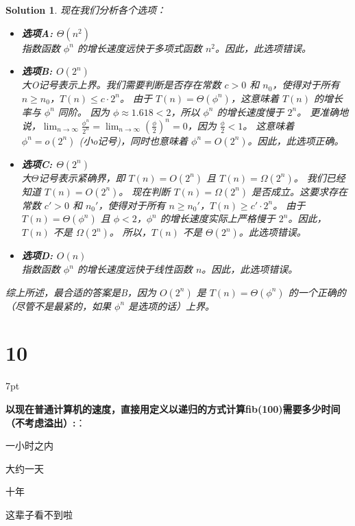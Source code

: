 \documentclass[UTF8]{report}
\newtheorem{solution}{Solution}
\theoremstyle{MyLineTheoremStyle} %
\theoremstyle{MyBlockTheoremStyle} %
\theoremstyle{MySubsubsectionStyle} %
\newenvironment{graybox}{%
        \def\FrameCommand{%
        \hspace{1pt}%
        {\color{gray}\small \vrule width 2pt}%
        {\color{graybox_color}\vrule width 4pt}%
        \colorbox{graybox_color}%
        }%
        \MakeFramed{\advance\hsize-\width\FrameRestore}%
        \noindent\hspace{-4.55pt}%
        \begin{adjustwidth}{}{7pt}%
        \vspace{2pt}\vspace{2pt}%
        }
        {%
        \vspace{2pt}\end{adjustwidth}\endMakeFramed%
        }
\begin{document}
\begin{solution}
现在我们分析各个选项：
\begin{itemize}
    \item \textbf{选项A: $\Theta(n^2)$} \\
    指数函数 $\phi^n$ 的增长速度远快于多项式函数 $n^2$。因此，此选项错误。
    \item \textbf{选项B: $O(2^n)$} \\
    大O记号表示上界。我们需要判断是否存在常数 $c > 0$ 和 $n_0$，使得对于所有 $n \ge n_0$，$T(n) \le c \cdot 2^n$。
    由于 $T(n) = \Theta(\phi^n)$，这意味着 $T(n)$ 的增长率与 $\phi^n$ 同阶。
    因为 $\phi \approx 1.618 < 2$，所以 $\phi^n$ 的增长速度慢于 $2^n$。
    更准确地说，$\lim_{n\to\infty} \frac{\phi^n}{2^n} = \lim_{n\to\infty} (\frac{\phi}{2})^n = 0$，因为 $\frac{\phi}{2} < 1$。
    这意味着 $\phi^n = o(2^n)$ (小o记号)，同时也意味着 $\phi^n = O(2^n)$。因此，此选项正确。
    \item \textbf{选项C: $\Theta(2^n)$} \\
    大$\Theta$记号表示紧确界，即 $T(n) = O(2^n)$ 且 $T(n) = \Omega(2^n)$。
    我们已经知道 $T(n) = O(2^n)$。
    现在判断 $T(n) = \Omega(2^n)$ 是否成立。这要求存在常数 $c' > 0$ 和 $n_0'$，使得对于所有 $n \ge n_0'$，$T(n) \ge c' \cdot 2^n$。
    由于 $T(n) = \Theta(\phi^n)$ 且 $\phi < 2$，$\phi^n$ 的增长速度实际上严格慢于 $2^n$。因此，$T(n)$ 不是 $\Omega(2^n)$。
    所以，$T(n)$ 不是 $\Theta(2^n)$。此选项错误。
    \item \textbf{选项D: $O(n)$} \\
    指数函数 $\phi^n$ 的增长速度远快于线性函数 $n$。因此，此选项错误。
\end{itemize}
综上所述，最合适的答案是B，因为 $O(2^n)$ 是 $T(n) = \Theta(\phi^n)$ 的一个正确的（尽管不是最紧的，如果 $\phi^n$ 是选项的话）上界。
\end{solution}

\section*{10}

\begin{graybox}
\textbf{以现在普通计算机的速度，直接用定义以递归的方式计算fib(100)需要多少时间（不考虑溢出）:}：
\begin{circledenum}
    \item 一小时之内
    \item 大约一天
    \item 十年
    \item 这辈子看不到啦
\end{circledenum}
\end{graybox}
\end{document}
